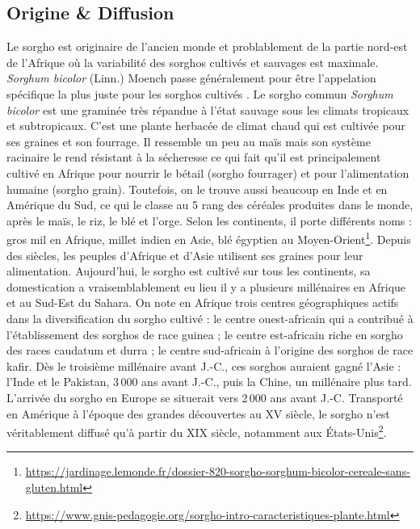 \documentclass[a4paper,11pt]{article}
\begin{document}
\subsection{Origine \& Diffusion}

Le sorgho est originaire de l'ancien monde et problablement de la
partie nord-est de l'Afrique où la variabilité des sorghos cultivés et
sauvages est maximale. \emph{Sorghum bicolor} (Linn.) Moench passe
généralement pour être l'appelation spécifique la plus juste pour les
sorghos cultivés \cite{food1977introduction}. Le sorgho commun
\emph{Sorghum bicolor} est une graminée très répandue à l'état sauvage
sous les climats tropicaux et subtropicaux. C'est une plante herbacée
de climat chaud qui est cultivée pour ses graines et son fourrage. Il
ressemble un peu au maïs mais son système racinaire le rend résistant
à la sécheresse ce qui fait qu'il est principalement cultivé en
Afrique pour nourrir le bétail (sorgho fourrager) et pour
l'alimentation humaine (sorgho grain). Toutefois, on le trouve aussi
beaucoup en Inde et en Amérique du Sud, ce qui le classe au 5\ieme{}
rang des céréales produites dans le monde, après le maïs, le riz, le
blé et l'orge. Selon les continents, il porte différents noms :
\og{}gros mil\fg{} en Afrique, \og{}millet indien\fg{} en Asie,
\og{}blé égyptien\fg{} au
Moyen-Orient\footnote{\url{https://jardinage.lemonde.fr/dossier-820-sorgho-sorghum-bicolor-cereale-sans-gluten.html}}. Depuis
des siècles, les peuples d'Afrique et d'Asie utilisent ses graines
pour leur alimentation. Aujourd'hui, le sorgho est cultivé sur tous
les continents, sa domestication a vraisemblablement eu lieu il y a
plusieurs millénaires en Afrique et au Sud-Est du Sahara. On note en
Afrique trois centres géographiques actifs dans la diversification du
sorgho cultivé : le centre ouest-africain qui a contribué à
l'établissement des sorghos de race guinea ; le centre est-africain
riche en sorgho des races caudatum et durra ; le centre sud-africain à
l'origine des sorghos de race kafir. Dès le troisième millénaire avant
J.-C., ces sorghos auraient gagné l'Asie : l'Inde et le Pakistan,
3\,000 ans avant J.-C., puis la Chine, un millénaire plus
tard. L'arrivée du sorgho en Europe se situerait vers 2\,000 ans avant
J.-C. Transporté en Amérique à l'époque des grandes découvertes au
\textsc{XV}\ieme{} siècle, le sorgho n'est véritablement diffusé qu'à
partir du \textsc{XIX}\ieme{} siècle, notamment aux
États-Unis\footnote{\url{https://www.gnis-pedagogie.org/sorgho-intro-caracteristiques-plante.html}}.
\end{document}
